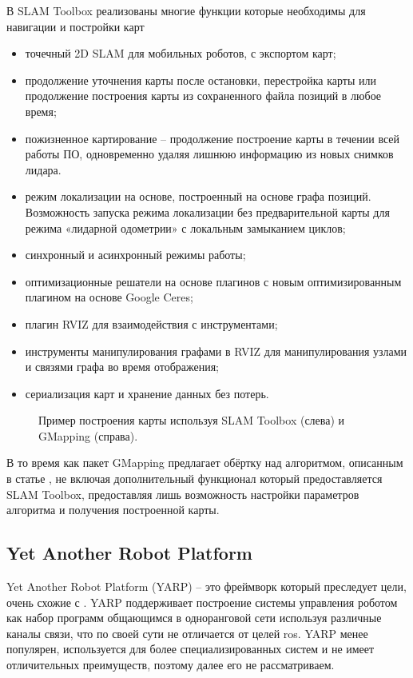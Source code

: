В SLAM Toolbox реализованы многие функции которые необходимы для навигации и
постройки карт
\begin{itemize}
	\item точечный 2D SLAM для мобильных роботов, с экспортом карт;
	\item продолжение уточнения карты после остановки, перестройка карты или
		продолжение построения карты из сохраненного файла позиций в любое
		время;
	\item пожизненное картирование -- продолжение построение карты  в течении
		всей работы ПО, одновременно удаляя лишнюю информацию из новых снимков
		лидара.
	\item режим локализации на основе, построенный на основе графа позиций.
		Возможность запуска режима локализации без предварительной карты для
		режима «лидарной одометрии» с локальным замыканием циклов;
	\item синхронный и асинхронный режимы работы;
	\item оптимизационные решатели на основе плагинов с новым оптимизированным
		плагином на основе Google Ceres;
	\item плагин RVIZ для взаимодействия с инструментами;
	\item инструменты манипулирования графами в RVIZ для манипулирования узлами
		и связями графа во время отображения;
	\item сериализация карт и хранение данных без потерь.
\end{itemize}

\begin{figure}[h]
\centering
	\caption{Пример построения карты используя SLAM Toolbox (слева) и GMapping
	(справа).}
	\label{ris:map_example}
\end{figure}

В то время как пакет GMapping предлагает обёртку над алгоритмом,
описанным в статье \cite{grisetti2005improving}, не включая дополнительный
функционал который предоставляется SLAM Toolbox, предоставляя лишь возможность настройки параметров алгоритма и получения построенной карты.

\subsection{Yet Another Robot Platform}
Yet Another Robot Platform (YARP) \cite{metta2006yarp} -- это фреймворк который
преследует цели, очень схожие с \ros{}. YARP поддерживает построение системы
управления роботом как набор программ общающимся в одноранговой сети используя
различные каналы связи, что по своей сути не отличается от целей ros{}. YARP
менее популярен, используется для более специализированных систем и не имеет
отличительных преимуществ, поэтому далее его не рассматриваем.


